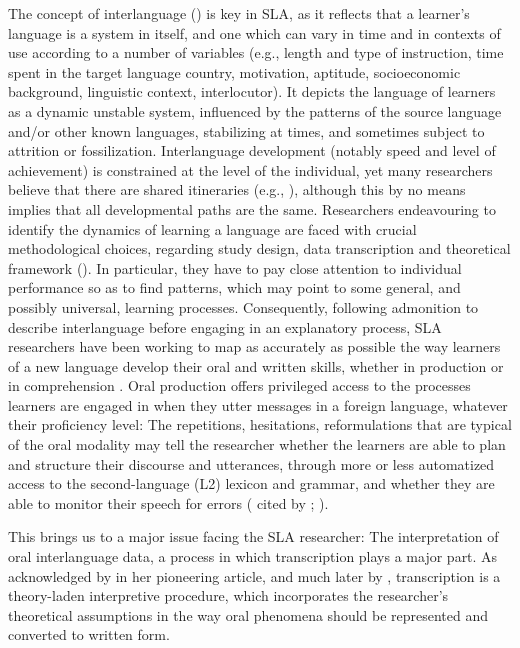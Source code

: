 \documentclass[output=paper,colorlinks,citecolor=brown,modfonts,nonflat]{../langscibook}
\begin{document}
The concept of interlanguage (\citealt{Selinker1972,HanTarone2014,Pallotti2017}) is key in SLA, as it reflects that a learner’s language is a system in itself, and one which can vary in time and in contexts of use according to a number of variables (e.g., length and type of instruction, time spent in the target language country, motivation, aptitude, socioeconomic background, linguistic context, interlocutor). It depicts the language of learners as a dynamic unstable system, influenced by the patterns of the source language and/or other known languages, stabilizing at times, and sometimes subject to attrition or fossilization. Interlanguage development (notably speed and level of achievement) is constrained at the level of the individual, yet many researchers believe that there are shared itineraries (e.g., \citealt{BartningSchlyter2004}), although this by no means implies that all developmental paths are the same. Researchers endeavouring to identify the dynamics of learning a language are faced with crucial methodological choices, regarding study design, data transcription and theoretical framework (\citealt{MackeyGass2012,Revesz2012}). In particular, they have to pay close attention to individual performance so as to find patterns, which may point to some general, and possibly universal, learning processes. Consequently, following  admonition to describe interlanguage before engaging in an explanatory process, SLA researchers have been working to map as accurately as possible the way learners of a new language develop their oral and written skills, whether in production or in comprehension \citep{Ortega2014trying}. Oral production offers privileged access to the processes learners are engaged in when they utter messages in a foreign language, whatever their proficiency level: The repetitions, hesitations, reformulations that are typical of the oral modality may tell the researcher whether the learners are able to plan and structure their discourse and utterances, through more or less automatized access to the second-language (L2) lexicon and grammar, and whether they are able to monitor their speech for errors (\citealt[47]{Segalowitz2010} cited by \citealt[29]{Hilton2014}; \citealt{Kormos2006}).

This brings us to a major issue facing the SLA researcher: The interpretation of oral interlanguage data, a process in which transcription plays a major part. As acknowledged by \citet{Ochs1979} in her pioneering article, and much later by \citet{Mondada2000, Mondada2002, Mondada2007}, transcription is a theory-laden interpretive procedure, which incorporates the researcher’s theoretical assumptions in the way oral phenomena should be represented and converted to written form. 
\end{document}
